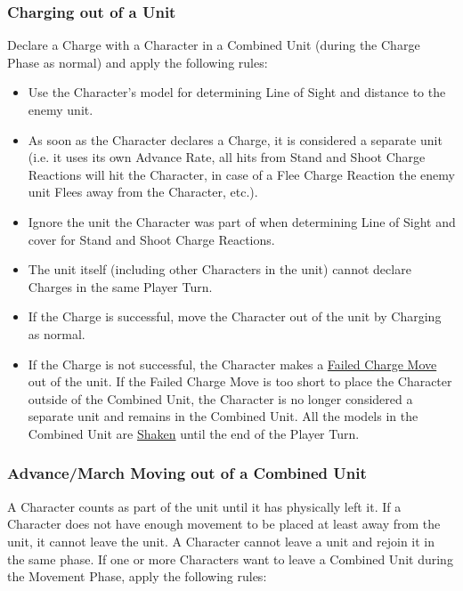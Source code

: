 \subsubsection{Charging out of a Unit}

Declare a Charge with a Character in a Combined Unit (during the Charge Phase as normal) and apply the following rules:

\begin{itemize}
\item Use the Character's model for determining Line of Sight and distance to the enemy unit.
\item As soon as the Character declares a Charge, it is considered a separate unit (i.e. it uses its own Advance Rate, all hits from Stand and Shoot Charge Reactions will hit the Character, in case of a Flee Charge Reaction the enemy unit Flees away from the Character, etc.).
\item Ignore the unit the Character was part of when determining Line of Sight and cover for Stand and Shoot Charge Reactions.
\item The unit itself (including other Characters in the unit) cannot declare Charges in the same Player Turn.
\item If the Charge is successful, move the Character out of the unit by Charging as normal.
\item If the Charge is not successful, the Character makes a \hyperref[failed_charge]{Failed Charge Move} out of the unit. If the Failed Charge Move is too short to place the Character outside  of the Combined Unit, the Character is no longer considered a separate unit and remains in the Combined Unit. All the models in the Combined Unit are \hyperref[shaken]{Shaken} until the end of the Player Turn.
\end{itemize}

\subsubsection{Advance/March Moving out of a Combined Unit}

A Character counts as part of the unit until it has physically left it. If a Character does not have enough movement to be placed at least  away from the unit, it cannot leave the unit. A Character cannot leave a unit and rejoin it in the same phase. If one or more Characters want to leave a Combined Unit during the Movement Phase, apply the following rules:

